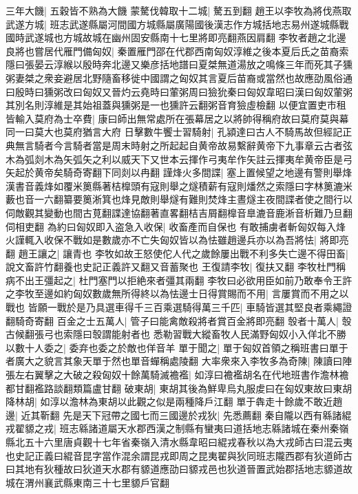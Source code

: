 三年大饑|{
	五穀皆不熟為大饑}
蒙驁伐韓取十二城|{
	驁五到翻}
趙王以李牧為將伐燕取武遂方城|{
	班志武遂縣屬河間國方城縣屬廣陽國後漢志作方城括地志易州遂城縣戰國時武遂城也方城故城在幽州固安縣南十七里將即亮翻燕因肩翻}
李牧者趙之北邊良將也嘗居代雁門備匈奴|{
	秦置雁門邵在代郡西南匈奴淳維之後本夏后氏之苗裔索隱曰張晏云淳緱以殷時奔北邊又樂彦括地譜曰夏桀無道湯放之鳴條三年而死其子獯粥妻桀之衆妾避居北野隨畜移徙中國謂之匈奴其言夏后苗裔或當然也故應劭風俗通曰殷時曰獯粥改曰匈奴又晉灼云堯時曰葷粥周曰獫狁秦曰匈奴韋昭曰漢曰匈奴葷粥其別名則淳維是其始祖蓋與獯粥是一也獯許云翻粥音育獫虛檢翻}
以便宜置吏市租皆輸入莫府為士卒費|{
	康曰師出無常處所在張幕居之以將帥得稱府故曰莫府莫與幕同一曰莫大也莫府猶言大府}
日擊數牛饗士習騎射|{
	孔潁達曰古人不騎馬故但經記正典無言騎者今言騎者當是周末時射之所起起自黄帝故易繫辭黄帝下九事章云古者弦木為弧剡木為矢弧矢之利以威天下又世本云揮作弓夷牟作矢註云揮夷牟黄帝臣是弓矢起於黄帝矣騎奇寄翻下同剡以冉翻}
謹烽火多間諜|{
	塞上置候望之地邊有警則舉烽漢書音義烽如覆米䉛縣著桔橰頭有寇則舉之燧積薪有寇則燔然之索隱曰字林䉛漉米藪也音一六翻纂要䉛淅箕也烽見敵則舉燧有難則焚烽主晝燧主夜間諜者使之間行以伺敵觀其變動也間古莧翻諜達協翻著直畧翻桔吉屑翻橰音臯漉音鹿淅音析難乃旦翻伺相吏翻}
為約曰匈奴即入盗急入收保|{
	收畜產而自保也}
有敢捕虜者斬匈奴每入烽火謹輒入收保不戰如是數歲亦不亡失匈奴皆以為怯雖趙邊兵亦以為吾將怯|{
	將即亮翻}
趙王讓之|{
	讓青也}
李牧如故王怒使佗人代之歲餘屢出戰不利多失亡邊不得田畜|{
	說文畜許竹翻養也史記正義許又翻又音蓄聚也}
王復請李牧|{
	復扶又翻}
李牧杜門稱病不出王彊起之|{
	杜門塞門以拒絶來者彊其兩翻}
李牧曰必欲用臣如前乃敢奉令王許之李牧至邊如約匈奴數歲無所得終以為怯邊士日得賞賜而不用|{
	言屢賞而不用之以戰也}
皆願一戰於是乃具選車得千三百乘選騎得萬三千匹|{
	車騎皆選其堅良者乘繩證翻騎奇寄翻}
百金之士五萬人|{
	管子曰能禽敵殺將者賞百金將即亮翻}
彀者十萬人|{
	彀古候翻張弓也索隱曰彀謂能射者也}
悉勒習戰大縱畜牧人民滿野匈奴小入佯北不勝以數十人委之|{
	委弃也委之於敵也佯音羊}
單于聞之|{
	單于匈奴首領之稱班書曰單于者廣大之貌言其象天單于然也單音蟬稱處陵翻}
大率衆來入李牧多為奇陳|{
	陳讀曰陣}
張左右翼擊之大破之殺匈奴十餘萬騎滅襜襤|{
	如淳曰襜襤胡名在代地班書作澹林襜都甘翻襤路談翻類篇盧甘翻}
破東胡|{
	東胡其後為鮮卑烏丸服䖍曰在匈奴東故曰東胡}
降林胡|{
	如淳以澹林為東胡以此觀之似是兩種降戶江翻}
單于犇走十餘歲不敢近趙邊|{
	近其靳翻}
先是天下冠帶之國七而三國邊於戎狄|{
	先悉薦翻}
秦自隴以西有緜諸緄戎翟䝠之戎|{
	班志緜諸道屬天水郡西漢之制縣有蠻夷曰道括地志緜諸城在秦州秦嶺縣北五十六里唐貞觀十七年省秦嶺入清水縣韋昭曰緄戎春秋以為大戎師古曰混云夷也史記正義曰緄音昆字當作混余謂昆戎即周之昆夷翟與狄同班志隴西郡有狄道師古曰其地有狄種故曰狄道天水郡有䝠道應劭曰䝠戎邑也狄道晉置武始郡括地志䝠道故城在渭州襄武縣東南三十七里䝠戶官翻}
